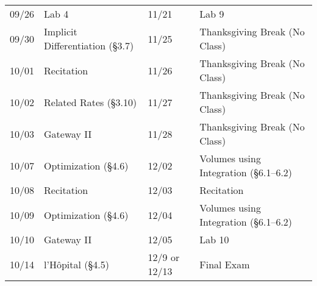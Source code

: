 \documentclass[11pt,letterpaper]{article}
\begin{document}
\begin{table}[!ht]
{\begin{tabular}{ll || ll}
	09/26 & Lab 4 & 11/21 & Lab 9 \\
	09/30 & Implicit Differentiation (\S3.7) & 11/25 & Thanksgiving Break (No Class) \\
	10/01 & Recitation & 11/26 & Thanksgiving Break (No Class) \\
	10/02 & Related Rates (\S3.10) & 11/27 & Thanksgiving Break (No Class) \\
	10/03 & Gateway II & 11/28 & Thanksgiving Break (No Class) \\
	10/07 & Optimization (\S4.6) & 12/02 & Volumes using Integration (\S6.1--6.2) \\
	10/08 & Recitation & 12/03 & Recitation \\	
	10/09 & Optimization (\S4.6) & 12/04 & Volumes using Integration (\S6.1--6.2) \\
	10/10 & Gateway II & 12/05 & Lab 10 \\
	10/14 & l'H\^{o}pital (\S4.5) & 12/9 or 12/13 & Final Exam
        \end{tabular}
        }
        \end{table}
\end{document}
